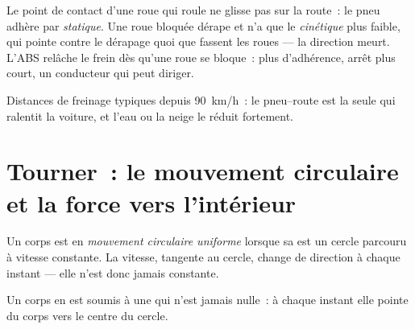 \begin{remark}\label{rem:g11:forces-and-motion:abs}
Le point de contact d'une roue qui roule ne glisse pas sur la route~:
le pneu adhère par 
\emph{statique}. Une roue bloquée dérape et n'a que le
 \emph{cinétique} plus faible, qui
pointe contre le dérapage quoi que fassent les roues --- la direction
meurt. L'ABS relâche le frein dès qu'une roue se bloque~: plus
d'adhérence, arrêt plus court, un conducteur qui peut diriger.
\end{remark}

\begin{omfigure}

{\small Distances de freinage typiques depuis \qty{90}{km/h}~: le
 pneu--route est la seule
 qui ralentit la voiture, et l'eau ou la
neige le réduit fortement.}
\end{omfigure}

\section{Tourner~: le mouvement circulaire et la force vers l'intérieur}

\begin{definition}\label{def:g11:forces-and-motion:ucm}
Un corps est en \emph{mouvement circulaire uniforme} lorsque sa
 est un cercle parcouru
à vitesse constante. La vitesse, tangente au cercle, change de direction
à chaque instant --- elle n'est donc jamais constante.
\end{definition}

\begin{proposition}\label{prop:g11:forces-and-motion:inward}
Un corps en 
est soumis à une  qui
n'est jamais nulle~: à chaque instant elle pointe du corps vers le
centre du cercle.
\end{proposition}

